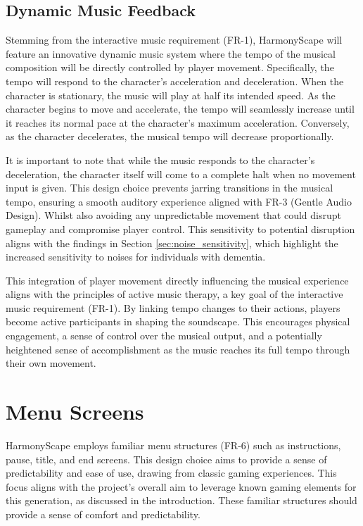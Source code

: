 \documentclass{l4proj}
\begin{document}
\subsection{Dynamic Music Feedback}

Stemming from the interactive music requirement (FR-1), HarmonyScape will feature an innovative dynamic music system where the tempo of the musical composition will be directly controlled by player movement. Specifically, the tempo will respond to the character's acceleration and deceleration. When the character is stationary, the music will play at half its intended speed. As the character begins to move and accelerate, the tempo will seamlessly increase until it reaches its normal pace at the character's maximum acceleration. Conversely, as the character decelerates, the musical tempo will decrease proportionally.

It is important to note that while the music responds to the character's deceleration, the character itself will come to a complete halt when no movement input is given. This design choice prevents jarring transitions in the musical tempo, ensuring a smooth auditory experience aligned with FR-3 (Gentle Audio Design). Whilst also avoiding any unpredictable movement that could disrupt gameplay and compromise player control. This sensitivity to potential disruption aligns with the findings in Section \ref{sec:noise_sensitivity}, which highlight the increased sensitivity to noises for individuals with dementia.

This integration of player movement directly influencing the musical experience aligns with the principles of active music therapy, a key goal of the interactive music requirement (FR-1). By linking tempo changes to their actions, players become active participants in shaping the soundscape. This encourages physical engagement, a sense of control over the musical output, and a potentially heightened sense of accomplishment as the music reaches its full tempo through their own movement.

\section{Menu Screens}
HarmonyScape employs familiar menu structures (FR-6) such as instructions, pause, title, and end screens. This design choice aims to provide a sense of predictability and ease of use, drawing from classic gaming experiences. This focus aligns with the project's overall aim to leverage known gaming elements for this generation, as discussed in the introduction. These familiar structures should provide a sense of comfort and predictability.
\end{document}
